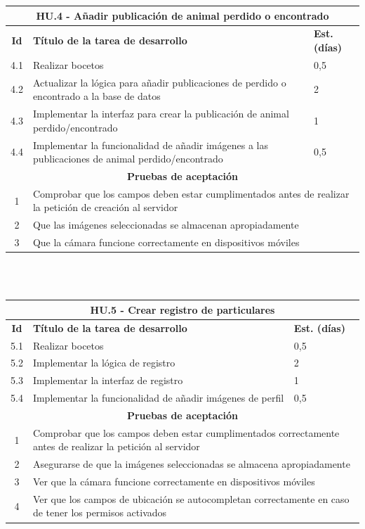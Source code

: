 \begin{tabular}{|c|p{9.5cm}|p{1cm}|}
	\hline
	\multicolumn{3}{|c|}{\textbf{HU.4 - Añadir publicación de animal perdido o encontrado}} \\
	\hline
	\textbf{Id} & \textbf{Título de la tarea de desarrollo} & \textbf{Est. (días)} \\
	\hline
	4.1 & Realizar bocetos & 0,5 \\ \hline
	4.2 &  Actualizar la lógica para añadir publicaciones de perdido o encontrado a la base de datos & 2 \\ \hline
	4.3 &  Implementar la interfaz para crear la publicación de animal perdido/encontrado & 1 \\ \hline
	4.4 &  Implementar la funcionalidad de añadir imágenes a las publicaciones de animal perdido/encontrado & 0,5 \\ \hline
	\multicolumn{3}{|c|}{\textbf{Pruebas de aceptación}} \\ \hline
	1 & \multicolumn{2}{|p{10cm}|}{Comprobar que los campos deben estar cumplimentados antes de realizar la petición de creación al servidor} \\ \hline
	2 & \multicolumn{2}{|p{10cm}|}{Que las imágenes seleccionadas se almacenan apropiadamente} \\ \hline
	3 & \multicolumn{2}{|p{10cm}|}{Que la cámara funcione correctamente en dispositivos móviles} \\ \hline
\end{tabular} \\ \\

\begin{tabular}{|c|p{9.5cm}|p{1cm}|}
	\hline
	\multicolumn{3}{|c|}{\textbf{HU.5 - Crear registro de particulares}} \\
	\hline
	\textbf{Id} & \textbf{Título de la tarea de desarrollo} & \textbf{Est. (días)} \\
	\hline
	5.1 & Realizar bocetos & 0,5 \\ \hline
	5.2 &  Implementar la lógica de registro & 2 \\ \hline
	5.3 &  Implementar la interfaz de registro & 1 \\ \hline
	5.4 &  Implementar la funcionalidad de añadir imágenes de perfil & 0,5 \\ \hline
	\multicolumn{3}{|c|}{\textbf{Pruebas de aceptación}} \\ \hline
	1 & \multicolumn{2}{|p{10cm}|}{Comprobar que los campos deben estar cumplimentados correctamente antes de realizar la petición al servidor} \\ \hline
	2 & \multicolumn{2}{|p{10cm}|}{Asegurarse de que la imágenes seleccionadas se almacena apropiadamente} \\ \hline
	3 & \multicolumn{2}{|p{10cm}|}{Ver que la cámara funcione correctamente en dispositivos móviles} \\ \hline
	4 & \multicolumn{2}{|p{10cm}|}{Ver que los campos de ubicación se autocompletan correctamente en caso de tener los permisos activados} \\ \hline
\end{tabular} \\ \\\\

